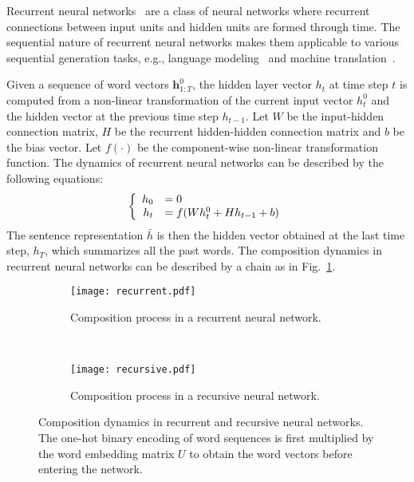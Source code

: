 \documentclass{article}
\theoremstyle{definition}
\begin{document}
Recurrent neural networks~\cite{elman1990finding} are a class of neural networks where recurrent connections between input units and hidden units are formed through time. The sequential nature of recurrent neural networks makes them applicable to various sequential generation tasks, e.g., language modeling~\cite{mikolov2010recurrent} and machine translation~\cite{bahdanau2014neural,cho2014properties}.

Given a sequence of word vectors $\mathbf{h}_{1:T}^0$, the hidden layer vector $h_t$ at time step $t$ is computed from a non-linear transformation of the current input vector $h_t^0$ and the hidden vector at the previous time step $h_{t-1}$. Let $W$ be the input-hidden connection matrix, $H$ be the recurrent hidden-hidden connection matrix and $b$ be the bias vector. Let $f(\cdot)$ be the component-wise non-linear transformation function. The dynamics of recurrent neural networks can be described by the following equations:
\begin{equation}
\left\lbrace
\begin{array}{r l}
h_0 & = 0 \\
h_t & = f(Wh_{t}^0 + Hh_{t-1} + b)
\end{array}
\right.
\end{equation}
The sentence representation $\bar{h}$ is then the hidden vector obtained at the last time step, $h_{T}$, which summarizes all the past words. The composition dynamics in recurrent neural networks can be described by a chain as in Fig.~\ref{fig:recurrent}.

\begin{figure}[htb]
\centering
	\begin{subfigure}[b]{0.4\textwidth}
		\texttt{[image: recurrent.pdf]}
		\caption{Composition process in a recurrent neural network.}
		\label{fig:recurrent}
	\end{subfigure}
	~
	\begin{subfigure}[b]{0.4\textwidth}
		\texttt{[image: recursive.pdf]}
		\caption{Composition process in a recursive neural network.}
		\label{fig:recursive}
	\end{subfigure}
\caption{Composition dynamics in recurrent and recursive neural networks. The one-hot binary encoding of word sequences is first multiplied by the word embedding matrix $U$ to obtain the word vectors before entering the network.}
\label{fig:nn}
\end{figure}
\end{document}
